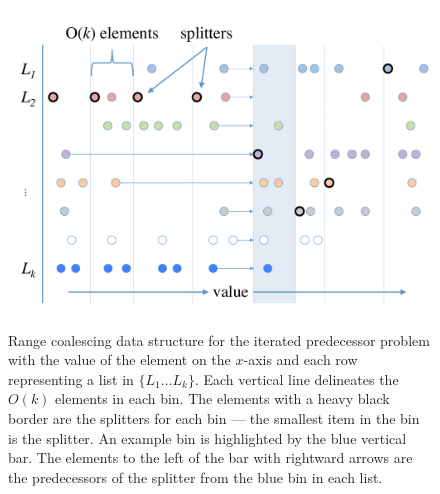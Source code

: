 \begin{figure}[h]
\includegraphics[scale=.3]{cache-oblivious-fractional-cascading-a.pdf}
\caption{Range coalescing data structure for the iterated predecessor problem with
the value of the element on the $x$-axis and each row representing a list in 
$\{ L_1 \ldots L_k \}$.
Each vertical line delineates the $O(k)$ elements in each bin.  The elements with a heavy
black border are the splitters for each bin --- the smallest item in the bin is
the splitter.  An example bin is highlighted by the blue vertical bar.  The elements
to the left of the bar with rightward arrows are the predecessors of the splitter
from the blue bin in each list.}
\label{fig:range_coalescing} 
\end{figure}

